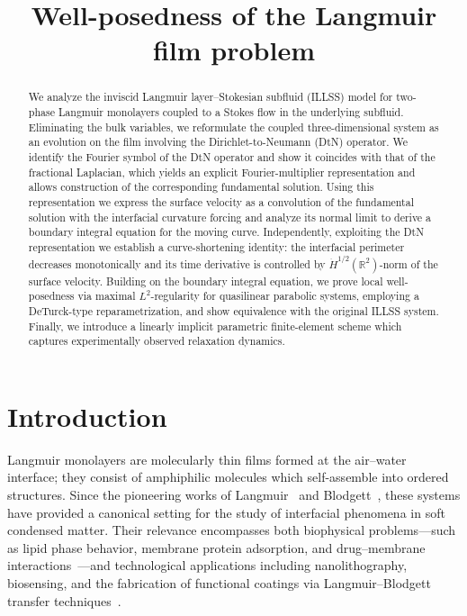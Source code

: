 \documentclass{article}
\title{Well-posedness of the Langmuir film problem}
\theoremstyle{remark}
\theoremstyle{definition}
\numberwithin{equation}{section}
\begin{document}
\maketitle

\begin{abstract}
    We analyze the inviscid Langmuir layer–Stokesian subfluid (ILLSS) model for two-phase Langmuir monolayers coupled to a Stokes flow in the underlying subfluid. Eliminating the bulk variables, we reformulate the coupled three-dimensional system as an evolution on the film involving the Dirichlet-to-Neumann (DtN) operator. We identify the Fourier symbol of the DtN operator and show it coincides with that of the fractional Laplacian, which yields an explicit Fourier-multiplier representation and allows construction of the corresponding fundamental solution. Using this representation we express the surface velocity as a convolution of the fundamental solution with the interfacial curvature forcing and analyze its normal limit to derive a boundary integral equation for the moving curve. Independently, exploiting the DtN representation we establish a curve-shortening identity: the interfacial perimeter decreases monotonically and its time derivative is controlled by $\dot{H}^{1/2}(\mathbb{R}^2)$-norm of the surface velocity. Building on the boundary integral equation, we prove local well-posedness via maximal $L^2$-regularity for quasilinear parabolic systems, employing a DeTurck-type reparametrization, and show equivalence with the original ILLSS system. Finally, we introduce a linearly implicit parametric finite-element scheme which captures experimentally observed relaxation dynamics.
\end{abstract}



\section{Introduction}
\label{sec:intro}

Langmuir monolayers are molecularly thin films formed at the air--water interface; they consist of amphiphilic molecules which self-assemble into ordered structures. Since the pioneering works of Langmuir~\cite{langmuir1917constitution} and Blodgett~\cite{blodgett1935films}, these systems have provided a canonical setting for the study of interfacial phenomena in soft condensed matter. Their relevance encompasses both biophysical problems—such as lipid phase behavior, membrane protein adsorption, and drug--membrane interactions~\cite{dynarowicz2024advantages,pereira2021recent,rojewska2021langmuir}—and technological applications including nanolithography, biosensing, and the fabrication of functional coatings via Langmuir--Blodgett transfer techniques~\cite{lin2024controllable}.
\end{document}
